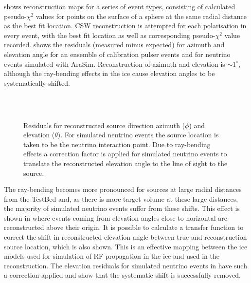  shows reconstruction maps for a series of event types, consisting of calculated pseudo-$\chi^{2}$ values for points on the surface of a sphere at the same radial distance as the best fit location. CSW reconstruction is attempted for each polarisation in every event, with the best fit location as well as corresponding pseudo-$\chi^{2}$ value recorded.  shows the residuals (measured minus expected) for azimuth and elevation angle for an ensemble of calibration pulser events and for neutrino events simulated with AraSim. Reconstruction of azimuth and elevation is $\sim 1^{\circ}$, although the ray-bending effects in the ice cause elevation angles to be systematically shifted. 


\begin{figure}[htpb]
  \hfill
  \\
  \hfill
  \\
  \hfill
  \caption{Residuals for reconstructed source direction azimuth ($\phi$) and elevation ($\theta$). For simulated neutrino events the source location is taken to be the neutrino interaction point. Due to ray-bending effects a correction factor is applied for simulated neutrino events to translate the reconstructed elevation angle to the line of sight to the source.}
  \label{fig:analysis:Reconstructed:CSW-Residuals}
\end{figure}


The ray-bending becomes more pronounced for sources at large radial distances from the TestBed and, as there is more target volume at these large distances, the majority of simulated neutrino events  suffer from these shifts. This effect is shown in  where events coming from elevation angles close to horizontal are reconstructed above their origin. It is possible to calculate a transfer function to correct the shift in reconstructed elevation angle between true and reconstruction source location, which is also shown. This is an effective mapping between the ice models used for simulation of RF propagation in the ice and used in the reconstruction. The elevation residuals for simulated neutrino events in  have such a correction applied and show that the systematic shift is successfully removed.

